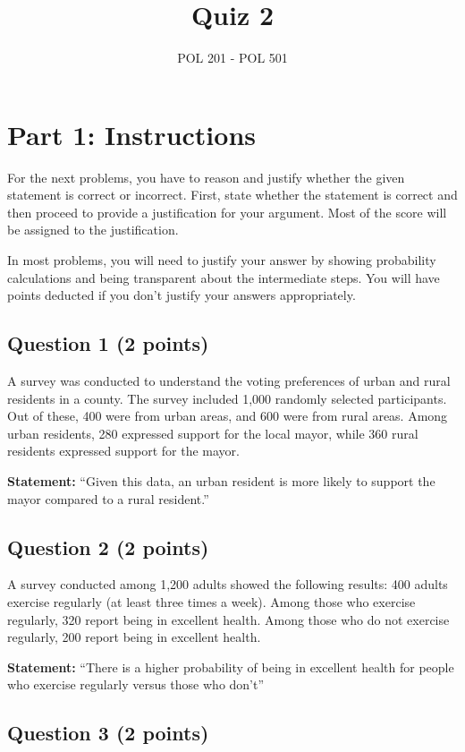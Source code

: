 \documentclass{article}
\title{Quiz 2}
\author{POL 201 - POL 501}
\date{}
\begin{document}
\maketitle

\section*{Part 1: Instructions}

For the next problems, you have to reason and justify whether the given statement is correct or incorrect. First, state whether the statement is correct and then proceed to provide a  justification for your argument. Most of the score will be assigned to the justification.

In most problems, you will need to justify your answer by showing probability calculations and being transparent about the intermediate steps. You will have points deducted if you don't justify your answers appropriately.

\subsection*{Question 1 (2 points)}

A survey was conducted to understand the voting preferences of urban and rural residents in a county. The survey included 1,000 randomly selected participants. Out of these, 400 were from urban areas, and 600 were from rural areas. Among urban residents, 280 expressed support for the local mayor, while 360 rural residents expressed support for the mayor.

\textbf{Statement:} ``Given this data, an urban resident is more likely to support the mayor compared to a rural resident.''

\subsection*{Question 2 (2 points)}

A survey conducted among 1,200 adults showed the following results: 400 adults exercise regularly (at least three times a week). Among those who exercise regularly, 320 report being in excellent health. Among those who do not exercise regularly, 200 report being in excellent health.

\textbf{Statement:} ``There is a higher probability of being in excellent health for people who exercise regularly versus those who don't''

\subsection*{Question 3 (2 points)}
\end{document}
